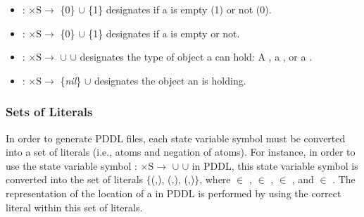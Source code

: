\begin{itemize}
\item {}: $\mathrm{\times S\rightarrow}$ \{0\} $\cup$ \{1\} designates if a  is empty (1) or not (0).

\item {}: $\mathrm{\times S\rightarrow}$ \{0\} $\cup$ \{1\} designates if a  is empty or not.

\item {}: $\mathrm{\times S \rightarrow}$ $\cup$  $\cup$  designates the type of object a  can hold: A , a , or a .

\item {}: $\mathrm{\times S \rightarrow}$ \{\textit{nil}\} $\cup$  designates the object an  is holding.
\end{itemize}


\subsubsection{Sets of Literals}
\label{subsubsect:Rigid_Relation}
In order to generate PDDL files, each state variable symbol must be converted into a set of literals (i.e., atoms and negation of atoms). For instance, in order to use the state variable symbol : $\mathrm{\times S\rightarrow}$ $\cup$  $\cup$  in PDDL, this state variable symbol is converted into the set of literals $\{$(,), (,), (,)$\}$, where  $\in$ ,  $\in$ ,  $\in$ , and  $\in$ . The representation of the location of a  in PDDL is performed by using the correct literal within this set of literals.


